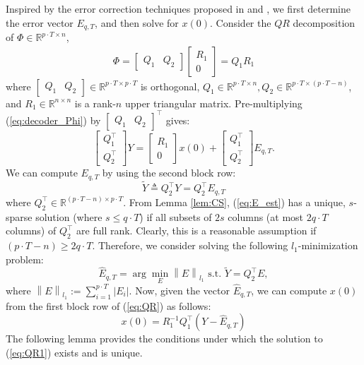 \documentclass[../../thesis.tex]{subfiles}
\newcommand{\norm}[1]{\left\lVert#1\right\rVert}
\begin{document}
Inspired by the error correction techniques proposed in \cite{tao11} and \cite{David_Chang}, we first determine the error vector $E_{q,T}$, and then solve for $x(0)$. 
Consider the $QR$ decomposition of $\Phi \in \mathbb{R}^{p\cdot T \times n}$,
\begin{eqnarray}
	\Phi = \begin{bmatrix} Q_1 & Q_2 \end{bmatrix} \begin{bmatrix} R_1 \\ 0 \end{bmatrix} = Q_1 R_1
\end{eqnarray}
where $\begin{bmatrix} Q_1 & Q_2 \end{bmatrix} \in \mathbb{R}^{p\cdot T \times p\cdot T}$ is orthogonal, $Q_1 \in \mathbb{R}^{p\cdot T\times n}, Q_2 \in \mathbb{R}^{p\cdot T \times (p\cdot T-n)}$, and $R_1 \in \mathbb{R}^{n\times n}$ is a rank-$n$ upper triangular matrix.
Pre-multiplying (\ref{eq:decoder_Phi}) by $\begin{bmatrix} Q_1 & Q_2 \end{bmatrix} ^\top$ gives:
\begin{equation}
	\begin{bmatrix} Q_1 ^\top \\ Q_2 ^\top \end{bmatrix} Y = \begin{bmatrix}R_1 \\ 0  \end{bmatrix} x(0) + \begin{bmatrix} Q_1 ^\top \\ Q_2^\top \end{bmatrix} E_{q,T}.
	\label{eq:QR}
\end{equation}
We can compute $E_{q,T}$ by using the second block row:
\begin{equation}
	\tilde Y \triangleq Q_2^\top Y = Q_2^\top E_{q,T}
	\label{eq:E_est}
\end{equation}
where $Q_2^\top \in \mathbb {R} ^{ (p\cdot T-n) \times p\cdot T}$.
From Lemma \ref{lem:CS}, (\ref{eq:E_est}) has a unique, $s$-sparse solution (where $s\le q\cdot T$) if all subsets of $2s$ columns (at most $2 q\cdot T$ columns) of $Q_2^\top$ are full rank. Clearly, this is a reasonable assumption if $(p\cdot T-n) \ge 2q\cdot T$. Therefore, we consider solving the following $l_1$-minimization problem:
\begin{equation}
	\hat{E}_{q,T} = \arg \min_E \norm { E}_{l_1} \text{ s.t. } \tilde Y = Q_2^\top E,
	\label{eq:solve_E}
\end{equation}
where $\norm{E}_{l_1}:= \sum_{i=1} ^{p\cdot T} \lvert E_i \rvert$. Now, given the vector $\hat{E}_{q,T}$, we can compute $x(0)$ from the first block row of (\ref{eq:QR}) as follows:
\begin{equation}
	x(0) = R_1^{-1} Q_1^\top (Y- \hat{E}_{q,T})
	\label{eq:QR1}
\end{equation}
The following lemma provides the conditions under which the solution to (\ref{eq:QR1}) exists and is unique.
\end{document}
